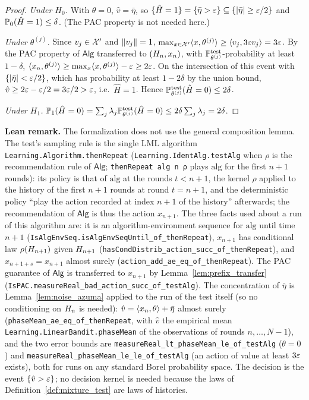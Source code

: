 \begin{proof}
\emph{Under $H_0$.} With $\theta = 0$, $\hat v = \bar\eta$, so
$\{\hat H = 1\} = \{\bar\eta > \varepsilon\} \subseteq \{\lvert \bar\eta \rvert \ge \varepsilon/2\}$ and
$\mathbb{P}_0(\hat H = 1) \le \delta$. (The PAC property is not needed here.)

\emph{Under $\theta^{(j)}$.} Since $v_j \in \mathcal{X}'$ and $\lVert v_j \rVert = 1$,
$\max_{x\in\mathcal{X}'}\langle x, \theta^{(j)} \rangle \ge \langle v_j, 3\varepsilon v_j \rangle = 3\varepsilon$. By the PAC property
of $\mathsf{Alg}$ transferred to $(H_n,x_n)$, with
$\mathbb{P}^{\mathrm{test}}_{\theta^{(j)}}$-probability at least $1-\delta$,
$\langle x_n, \theta^{(j)} \rangle \ge \max_x\langle x, \theta^{(j)} \rangle - \varepsilon \ge 2\varepsilon$. On the
intersection of this event with $\{\lvert \bar\eta \rvert < \varepsilon/2\}$, which has probability at least
$1 - 2\delta$ by the union bound, $\hat v \ge 2\varepsilon - \varepsilon/2 = 3\varepsilon/2 > \varepsilon$, i.e.\ $\hat H = 1$.
Hence $\mathbb{P}^{\mathrm{test}}_{\theta^{(j)}}(\hat H = 0) \le 2\delta$.

\emph{Under $H_1$.} $\mathbb{P}_1(\hat H = 0) = \sum_j\lambda_j\mathbb{P}^{\mathrm{test}}_{\theta^{(j)}}(\hat H = 0)
\le 2\delta\sum_j\lambda_j = 2\delta$.
\end{proof}

\textbf{Lean remark.} The formalization does not use the general composition lemma. The
test's sampling rule is the single LML algorithm \texttt{Learning.Algorithm.thenRepeat}
(\texttt{Learning.IdentAlg.testAlg} when $\rho$ is the recommendation rule of $\mathsf{Alg}$;
\texttt{thenRepeat alg n ρ} plays $\mathrm{alg}$ for the first $n+1$ rounds):
its policy is that of $\mathrm{alg}$ at the rounds $t < n+1$, the kernel $\rho$ applied to the
history of the first $n+1$ rounds at round $t = n+1$, and the deterministic policy ``play the
action recorded at index $n+1$ of the history'' afterwards; the recommendation of $\mathsf{Alg}$
is thus the action $x_{n+1}$. The three facts used about a run of this algorithm are: it is an
algorithm-environment sequence for $\mathrm{alg}$ until time $n+1$
(\texttt{IsAlgEnvSeq.isAlgEnvSeqUntil\_of\_thenRepeat}), $x_{n+1}$ has conditional law
$\rho(H_{n+1})$ given $H_{n+1}$ (\texttt{hasCondDistrib\_action\_succ\_of\_thenRepeat}),
and $x_{n+1+s} = x_{n+1}$ almost surely (\texttt{action\_add\_ae\_eq\_of\_thenRepeat}). The PAC
guarantee of $\mathsf{Alg}$ is transferred to $x_{n+1}$ by Lemma~\ref{lem:prefix_transfer}
(\texttt{IsPAC.measureReal\_bad\_action\_succ\_of\_testAlg}). The concentration of
$\bar\eta$ is Lemma~\ref{lem:noise_azuma} applied to the run of the test itself (so no
conditioning on $H_n$ is needed): $\hat v = \langle x_n, \theta \rangle + \bar\eta$ almost surely
(\texttt{phaseMean\_ae\_eq\_of\_thenRepeat}, with $\hat v$ the empirical mean
\texttt{Learning.LinearBandit.phaseMean} of the observations of rounds $n, \dots, N-1$), and the
two error bounds are \texttt{measureReal\_lt\_phaseMean\_le\_of\_testAlg} ($\theta = 0$) and
\texttt{measureReal\_phaseMean\_le\_le\_of\_testAlg} (an action of value at least $3\varepsilon$
exists), both for runs on any standard Borel probability space. The decision is the event
$\{\hat v > \varepsilon\}$; no decision kernel is needed because the laws of
Definition~\ref{def:mixture_test} are laws of histories.


